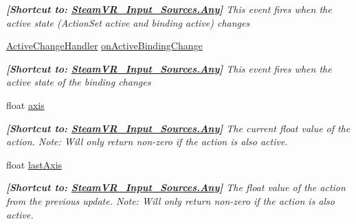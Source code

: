 \begin{DoxyCompactItemize}
\begin{DoxyCompactList}\small\item\em {\bfseries{\mbox{[}Shortcut to\+: \mbox{\hyperlink{namespace_valve_1_1_v_r_a82e5bf501cc3aa155444ee3f0662853faed36a1ef76a59ee3f15180e0441188ad}{Steam\+V\+R\+\_\+\+Input\+\_\+\+Sources.\+Any}}\mbox{]}}} This event fires when the active state (Action\+Set active and binding active) changes \end{DoxyCompactList}\item 
\mbox{\hyperlink{class_valve_1_1_v_r_1_1_steam_v_r___action___single_a45ad70dbb8a58191f373b7ae098b833b}{Active\+Change\+Handler}} \mbox{\hyperlink{class_valve_1_1_v_r_1_1_steam_v_r___action___single_ac2174a4a4cf474cb9141e6a6d9709f9c}{on\+Active\+Binding\+Change}}
\begin{DoxyCompactList}\small\item\em {\bfseries{\mbox{[}Shortcut to\+: \mbox{\hyperlink{namespace_valve_1_1_v_r_a82e5bf501cc3aa155444ee3f0662853faed36a1ef76a59ee3f15180e0441188ad}{Steam\+V\+R\+\_\+\+Input\+\_\+\+Sources.\+Any}}\mbox{]}}} This event fires when the active state of the binding changes \end{DoxyCompactList}\item 
float \mbox{\hyperlink{class_valve_1_1_v_r_1_1_steam_v_r___action___single_a31539f002182ea339ae7056f07987f8f}{axis}}
\begin{DoxyCompactList}\small\item\em {\bfseries{\mbox{[}Shortcut to\+: \mbox{\hyperlink{namespace_valve_1_1_v_r_a82e5bf501cc3aa155444ee3f0662853faed36a1ef76a59ee3f15180e0441188ad}{Steam\+V\+R\+\_\+\+Input\+\_\+\+Sources.\+Any}}\mbox{]}}} The current float value of the action. Note\+: Will only return non-\/zero if the action is also active. \end{DoxyCompactList}\item 
float \mbox{\hyperlink{class_valve_1_1_v_r_1_1_steam_v_r___action___single_a8a00ad5421754252a7e05ec832a3468b}{last\+Axis}}
\begin{DoxyCompactList}\small\item\em {\bfseries{\mbox{[}Shortcut to\+: \mbox{\hyperlink{namespace_valve_1_1_v_r_a82e5bf501cc3aa155444ee3f0662853faed36a1ef76a59ee3f15180e0441188ad}{Steam\+V\+R\+\_\+\+Input\+\_\+\+Sources.\+Any}}\mbox{]}}} The float value of the action from the previous update. Note\+: Will only return non-\/zero if the action is also active. \end{DoxyCompactList}\item 

\end{DoxyCompactItemize}
